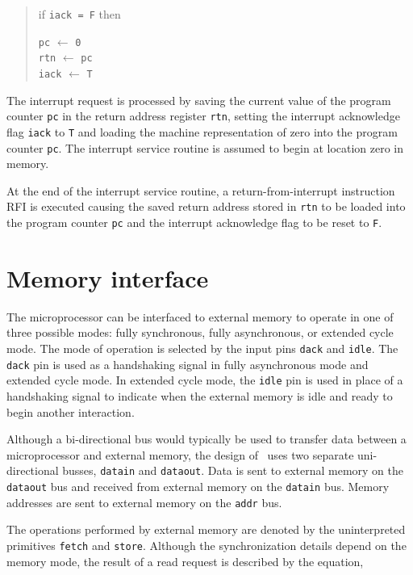 \begin{quote}
if \verb"iack = F" then

\hspace*{.25in}\verb"pc" $\leftarrow$ \verb"0"\\
\hspace*{.25in}\verb"rtn" $\leftarrow$ \verb"pc"\\
\hspace*{.25in}\verb"iack" $\leftarrow$ \verb"T"
\end{quote}

The interrupt request is processed by saving the current value of the program
counter \verb"pc" in
the return address register \verb"rtn",
setting the interrupt acknowledge flag \verb"iack" to \verb"T" and
loading the machine representation of zero into the program counter \verb"pc".
The interrupt service routine is assumed to begin at location zero
in memory.

At the end of the interrupt service routine,
a return-from-interrupt instruction RFI is executed causing
the saved return address
stored in \verb"rtn" to be loaded into the program counter
\verb"pc" and the interrupt acknowledge flag to be reset to \verb"F".

\section{Memory interface}
\label{sec-memory}

The microprocessor can be interfaced to external memory to
operate in one of three possible modes:
fully synchronous,
fully asynchronous,
or extended cycle mode.
The mode of operation is selected by the input pins
\verb"dack" and \verb"idle".
The \verb"dack" pin is used as a handshaking signal
in fully asynchronous mode and extended cycle mode.
In extended cycle mode,
the \verb"idle" pin is used
in place of a handshaking signal
to indicate when the external memory is idle and ready
to begin another interaction.

Although a bi-directional bus would typically be used to transfer data
between a microprocessor and external memory,
the design of \Tamarack\ uses
two separate uni-directional busses,
\verb"datain" and \verb"dataout".
Data is sent to external memory on the \verb"dataout" bus
and received from external memory on the \verb"datain" bus.
Memory addresses are sent to external memory on the \verb"addr" bus.

The operations performed by external memory are denoted by the
uninterpreted primitives \verb"fetch" and \verb"store".
Although the synchronization details depend on the memory mode,
the result of a read request is described by the equation,


